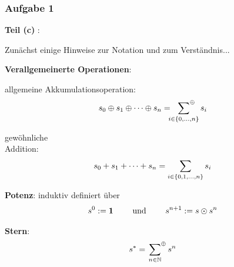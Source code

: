 \documentclass{beamer}
\begin{document}
\begin{frame}\frametitle{Aufgabe 1}
	\textbf{Teil (c)} :
	\small
	
	Zunächst einige Hinweise zur Notation und zum Verständnis...
	
	\pause
	
	\textbf{Verallgemeinerte Operationen}:
	
	\begin{minipage}[t]{\dimexpr0.5\linewidth-\fboxrule-\fboxsep}
		\centering
		allgemeine Akkumulationsoperation:
		\begin{equation*}
			s_0 \oplus s_1 \oplus \dots  \oplus s_n
			= \sideset{}{^\oplus}\sum_{i \in \left\{ 0, \dots, n \right\}} s_i
		\end{equation*}
	\end{minipage}
	\begin{minipage}[t]{\dimexpr0.5\linewidth-\fboxrule-\fboxsep}
		\centering
		gewöhnliche \\
		Addition:
		\begin{equation*}
			s_0 + s_1 + \dots + s_n = \sum_{i \in \left\{ 0, 1, \dots, n \right\}} s_i
		\end{equation*}
	\end{minipage}
	
	\pause
	
	\textbf{Potenz}: induktiv definiert über 
	\begin{equation*}
		s^0 \mathrel{:=} \mathbf{1} \qquad \text{ und } \qquad s^{n+1} \mathrel{:=} s \odot s^n
	\end{equation*}
	
	\pause
	
	\textbf{Stern}:
	\begin{equation*}
		s^\ast =  \sideset{}{^\oplus}\sum_{n \in \mathbb{N}} s^n
	\end{equation*}
\end{frame}
\end{document}
